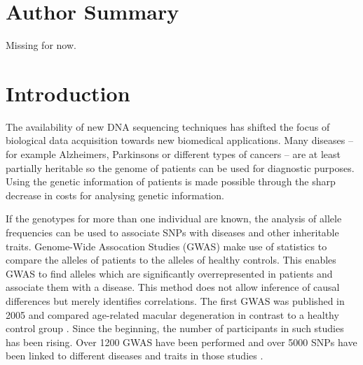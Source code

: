 \documentclass[10pt]{article}
\begin{document}
\section*{Author Summary}
Missing for now.

\section*{Introduction}

The availability of new DNA sequencing techniques has shifted the focus of biological data acquisition towards new biomedical applications.
Many diseases – for example Alzheimers, Parkinsons or different types of cancers – are at least partially heritable so the genome 
of patients can be used for diagnostic purposes. Using the genetic information of patients is made possible through the sharp decrease in costs for analysing genetic information. 



If the genotypes for more than one individual are known, the analysis of
allele frequencies can be used to associate SNPs with diseases and other inheritable traits. Genome-Wide Assocation Studies
(GWAS) make use of statistics to compare the alleles of patients to the alleles of healthy controls. This
enables GWAS to find alleles which are significantly overrepresented in patients and associate them with a disease.
This method does not allow inference of causal differences but merely identifies correlations. 
The first GWAS was published in 2005 and compared age-related macular degeneration in contrast 
to a healthy control group \cite{Klein2005}. Since the beginning, the number of participants in 
such studies has been rising. Over 1200 GWAS have been performed \cite{Johnson2009} and over 
5000 SNPs have been linked to different diseases and traits in those studies \cite{Hindorff2009}. 
\end{document}
